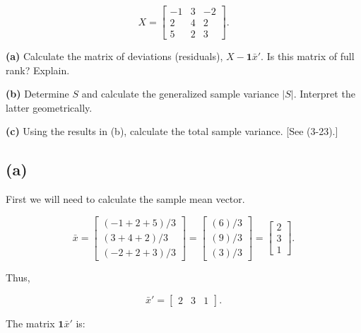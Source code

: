 \documentclass{article}
\begin{document}
$$
X=
\begin{bmatrix}
-1&3&-2\\
2&4&2\\
5&2&3
\end{bmatrix}.
$$

\vspace{0.2cm}

\noindent
\textbf{(a)} Calculate the matrix of deviations (residuals),
$X-\mathbf{1}\bar{x}'$. Is this matrix of full rank? Explain.

\vspace{0.2cm}

\noindent
\textbf{(b)} Determine $S$ and calculate the generalized sample
variance $|S|$. Interpret the latter geometrically.

\vspace{0.2cm}

\noindent
\textbf{(c)} Using the results in (b), calculate the total sample
variance. [See (3-23).]

\vspace{0.5cm}


\subsection*{(a)}

First we will need to calculate the sample mean vector.

$$
\bar{x}
=
\begin{bmatrix}
(-1+2+5)/3\\
(3+4+2)/3\\
(-2+2+3)/3
\end{bmatrix}
=
\begin{bmatrix}
(6)/3\\
(9)/3\\
(3)/3
\end{bmatrix}
=
\begin{bmatrix}
2\\
3\\
1
\end{bmatrix}.
$$

Thus,

$$
\bar{x}'
=
\begin{bmatrix}
2&3&1
\end{bmatrix}.
$$

The matrix $\mathbf{1}\bar{x}'$ is:
\end{document}
